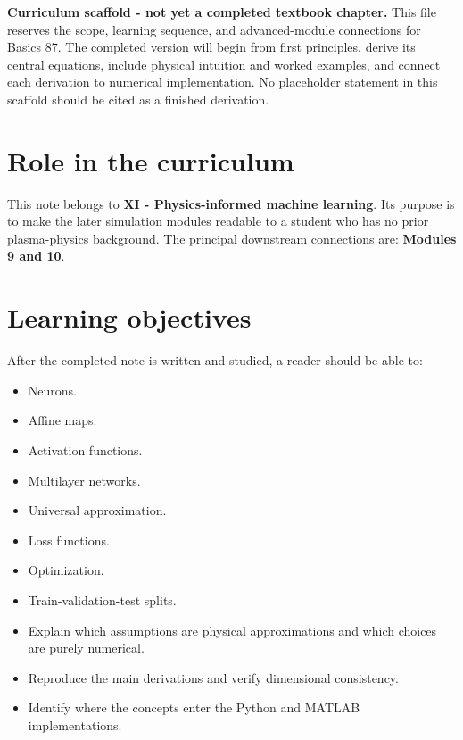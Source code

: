 \documentclass[11pt]{article}
\begin{document}

\begin{overviewbox}
\textbf{Curriculum scaffold - not yet a completed textbook chapter.} This file reserves the scope, learning sequence, and advanced-module connections for Basics 87. The completed version will begin from first principles, derive its central equations, include physical intuition and worked examples, and connect each derivation to numerical implementation. No placeholder statement in this scaffold should be cited as a finished derivation.
\end{overviewbox}

\ProjectTOC

\section{Role in the curriculum}
This note belongs to \textbf{XI - Physics-informed machine learning}. Its purpose is to make the later simulation modules readable to a student who has no prior plasma-physics background. The principal downstream connections are: \textbf{Modules 9 and 10}.

\section{Learning objectives}
After the completed note is written and studied, a reader should be able to:
\begin{itemize}[leftmargin=1.6em]
\item Neurons.
\item Affine maps.
\item Activation functions.
\item Multilayer networks.
\item Universal approximation.
\item Loss functions.
\item Optimization.
\item Train-validation-test splits.
\item Explain which assumptions are physical approximations and which choices are purely numerical.
\item Reproduce the main derivations and verify dimensional consistency.
\item Identify where the concepts enter the Python and MATLAB implementations.
\end{itemize}
\end{document}

